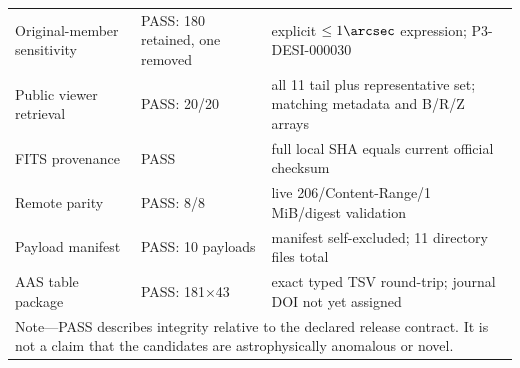 \documentclass[twocolumn]{aastex701}
\begin{document}
\begin{center}
\begin{tabular}{p{}p{}p{}}
Original-member sensitivity & PASS: 180 retained, one removed & explicit $\le1\arcsec$ expression; P3-DESI-000030 \\
Public viewer retrieval & PASS: 20/20 & all 11 tail plus representative set; matching metadata and B/R/Z arrays \\
FITS provenance & PASS & full local SHA equals current official checksum \\
Remote parity & PASS: 8/8 & live 206/Content-Range/1 MiB/digest validation \\
Payload manifest & PASS: 10 payloads & manifest self-excluded; 11 directory files total \\
AAS table package & PASS: 181$\times$43 & exact typed TSV round-trip; journal DOI not yet assigned \\
\bottomrule
\multicolumn{3}{p{0.88\textwidth}}{\footnotesize Note---PASS describes integrity relative to the
declared release contract. It is not a claim that the candidates are astrophysically anomalous
or novel.}\\
\end{tabular}
\end{center}
\end{document}
